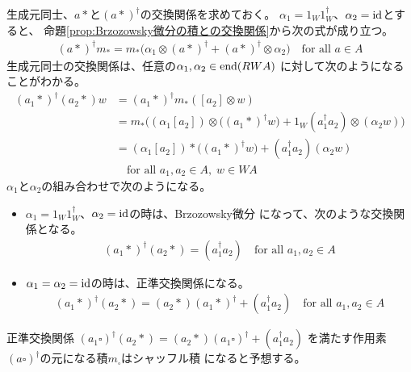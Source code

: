 		生成元同士、$a*$と$(a*)^\dag$の交換関係を求めておく。
		$\alpha_1=1_W1_W^\dag$、$\alpha_2={\operatorname{id}}$とすると、
		命題\ref{prop:Brzozowsky微分の積との交換関係}から次の式が成り立つ。
		\begin{equation*}\begin{split} %
			(a*)^\dag m_* 
			= m_*\bigl(\alpha_1\otimes (a*)^\dag+(a*)^\dag\otimes \alpha_2\bigr)
			\quad\text{for all }a\in A
		\end{split}\end{equation*} %
		生成元同士の交換関係は、任意の$\alpha_1,\alpha_2\in\operatorname{end}(RWA)$
		に対して次のようになることがわかる。
		\begin{equation*}\begin{split} %
			(a_1*)^\dag(a_2*)w &= (a_1*)^\dag m_*([a_2]\otimes w) \\
			&= m_*\biggl((\alpha_1[a_2])\otimes \bigl((a_1*)^\dag w\bigr)
			+ 1_W(a_1^\dag a_2)\otimes (\alpha_2w)\biggr) \\
			&= (\alpha_1[a_2])*\bigl((a_1*)^\dag w\bigr)
			+ (a_1^\dag a_2)(\alpha_2w) \\
			&\quad\text{for all }a_1,a_2\in A,\;w\in WA
		\end{split}\end{equation*} %
		$\alpha_1$と$\alpha_2$の組み合わせで次のようになる。
		\begin{itemize}\setlength{\itemsep}{-1mm} %
			\item $\alpha_1=1_W1_W^\dag$、$\alpha_2={\operatorname{id}}$の時は、Brzozowsky微分
			になって、次のような交換関係となる。
			\begin{equation*}\begin{split} %
				(a_1*)^\dag(a_2*) = (a_1^\dag a_2)
				\quad\text{for all }a_1,a_2\in A
			\end{split}\end{equation*} %
			\item $\alpha_1=\alpha_2={\operatorname{id}}$の時は、正準交換関係になる。
			\begin{equation*}\begin{split} %
				(a_1*)^\dag(a_2*) = (a_2*)(a_1*)^\dag + (a_1^\dag a_2)
				\quad\text{for all }a_1,a_2\in A
			\end{split}\end{equation*} %
		\end{itemize} %

		\begin{todo}[正準交換関係]\label{todo:正準交換関係} %
			正準交換関係
			$(a_1\square)^\dag(a_2*) = (a_2*)(a_1\square)^\dag+(a_1^\dag a_2)$
			を満たす作用素$(a\square)^\dag$の元になる積$m_\square$はシャッフル積
			になると予想する。
		\end{todo} %

